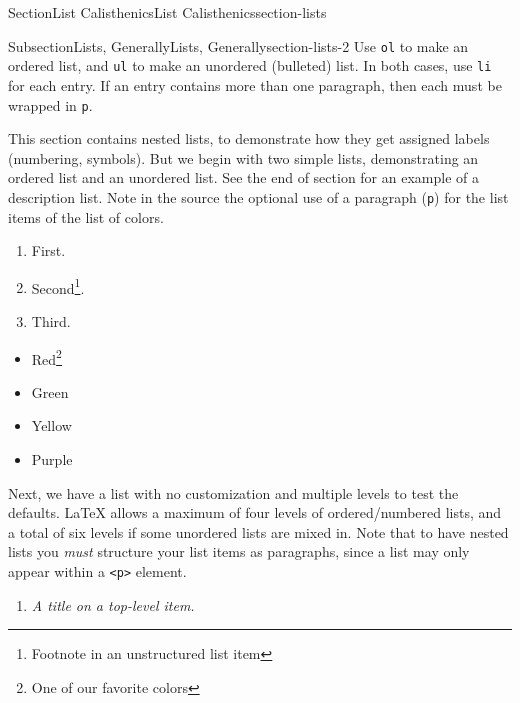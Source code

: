 \documentclass[twoside,10pt,]{article}
\newcommand{\mono}[1]{\texttt{#1}}
\newcommand{\lititle}[1]{{\slshape#1}}
\numberwithin{equation}{section}
\begin{document}
\begin{sectionptx}{Section}{List Calisthenics}{}{List Calisthenics}{}{}{section-lists}
%
%
\typeout{************************************************}
\typeout{************************************************}
%
\begin{subsectionptx}{Subsection}{Lists, Generally}{}{Lists, Generally}{}{}{section-lists-2}
%
%
%
%
Use \mono{ol} to make an ordered list, and \mono{ul} to make an unordered (bulleted) list. In both cases, use \mono{li} for each entry.  If an entry contains more than one paragraph, then each must be wrapped in \mono{p}. %
\par
This section contains nested lists, to demonstrate how they get assigned labels (numbering, symbols). But we begin with two simple lists, demonstrating an ordered list and an unordered list. See the end of section for an example of a description list. Note in the source the optional use of a paragraph (\mono{p}) for the list items of the list of colors.%
\par
%
\begin{enumerate}
\item{}First.%
\item{}Second\footnote{Footnote in an unstructured list item\label{section-lists-2-8-1-2-1}}.%
\item{}Third.%
\end{enumerate}
%
\begin{itemize}[label=\textbullet]
\item{}Red\footnote{One of our favorite colors\label{section-lists-2-8-2-1-1-1}}%
\item{}Green%
\item{}Yellow%
\item{}Purple%
\end{itemize}
%
\par
Next, we have a list with no customization and multiple levels to test the defaults.  \LaTeX{} allows a maximum of four levels of ordered\slash{}numbered lists, and a total of six levels if some unordered lists are mixed in.  Note that to have nested lists you \emph{must} structure your list items as paragraphs, since a list may only appear within a \mono{<p>} element.%
\begin{enumerate}
\item{}\lititle{A title on a top-level item.}\par%

\end{enumerate}
\end{subsectionptx}
\end{sectionptx}
\end{document}
